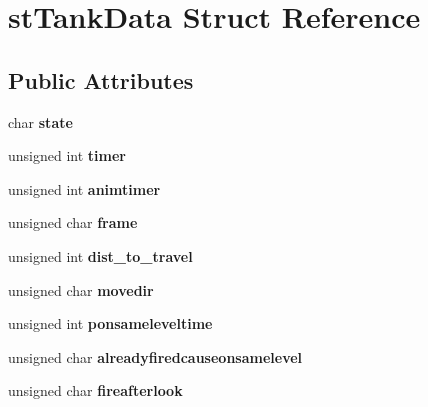\hypertarget{structst_tank_data}{
\section{stTankData Struct Reference}
\label{structst_tank_data}
}
\subsection*{Public Attributes}
\begin{DoxyCompactItemize}
\item 
\hypertarget{structst_tank_data_a58aae61836685b3945159196246e3dd4}{
char {\bfseries state}}
\label{structst_tank_data_a58aae61836685b3945159196246e3dd4}

\item 
\hypertarget{structst_tank_data_ae756eaadeae1f7fa6f685f22f6b6241a}{
unsigned int {\bfseries timer}}
\label{structst_tank_data_ae756eaadeae1f7fa6f685f22f6b6241a}

\item 
\hypertarget{structst_tank_data_a01badceee14ac7400550536b459081fa}{
unsigned int {\bfseries animtimer}}
\label{structst_tank_data_a01badceee14ac7400550536b459081fa}

\item 
\hypertarget{structst_tank_data_a46698871375085b259dbc024fe138d1f}{
unsigned char {\bfseries frame}}
\label{structst_tank_data_a46698871375085b259dbc024fe138d1f}

\item 
\hypertarget{structst_tank_data_ab7653ac11d002762eee380b82b35818d}{
unsigned int {\bfseries dist\_\-to\_\-travel}}
\label{structst_tank_data_ab7653ac11d002762eee380b82b35818d}

\item 
\hypertarget{structst_tank_data_a6c52b71bc0037edcb052c7746bb7528f}{
unsigned char {\bfseries movedir}}
\label{structst_tank_data_a6c52b71bc0037edcb052c7746bb7528f}

\item 
\hypertarget{structst_tank_data_afe7bf668364bdfd127a47b823c52e719}{
unsigned int {\bfseries ponsameleveltime}}
\label{structst_tank_data_afe7bf668364bdfd127a47b823c52e719}

\item 
\hypertarget{structst_tank_data_a03914f781c4aa224f3529ecd7386fb4b}{
unsigned char {\bfseries alreadyfiredcauseonsamelevel}}
\label{structst_tank_data_a03914f781c4aa224f3529ecd7386fb4b}

\item 
\hypertarget{structst_tank_data_a6b30913ef9ce5ecfcfb605298eade150}{
unsigned char {\bfseries fireafterlook}}
\label{structst_tank_data_a6b30913ef9ce5ecfcfb605298eade150}


\end{DoxyCompactItemize}
